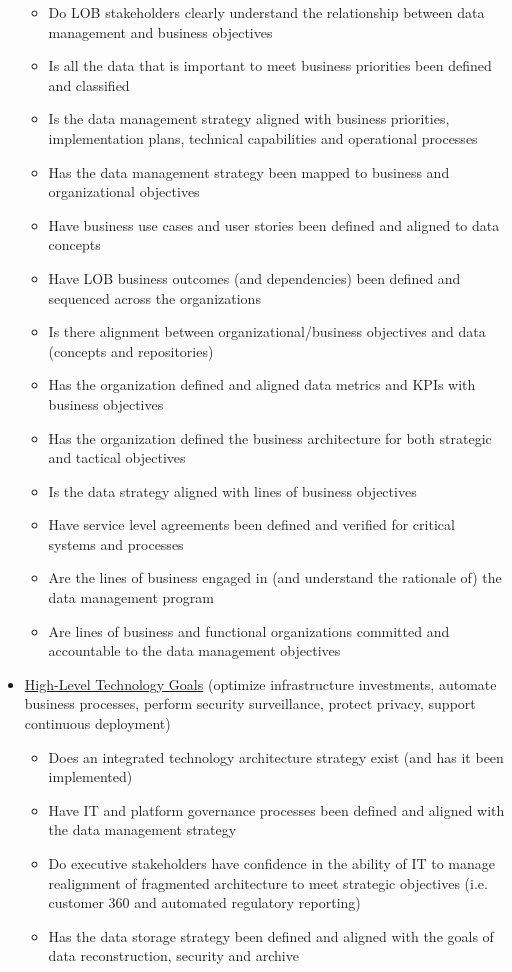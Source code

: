 \begin{itemize}
    \begin{itemize}
      \item Do LOB stakeholders clearly understand the relationship between data management and business objectives
      \item Is all the data that is important to meet business priorities been defined and classified
      \item Is the data management strategy aligned with business priorities, implementation plans, technical capabilities and operational processes
      \item Has the data management strategy been mapped to business and organizational objectives
      \item Have business use cases and user stories been defined and aligned to data concepts
      \item Have LOB business outcomes (and dependencies) been defined and sequenced across the organizations
      \item Is there alignment between organizational/business objectives and data (concepts and repositories)
      \item Has the organization defined and aligned data metrics and KPIs with business objectives
      \item Has the organization defined the business architecture for both strategic and tactical objectives
      \item Is the data strategy aligned with lines of business objectives
      \item Have service level agreements been defined and verified for critical systems and processes
      \item Are the lines of business engaged in (and understand the rationale of) the data management program
      \item Are lines of business and functional organizations committed and accountable to the data management objectives
    \end{itemize}

  \item \ul{High-Level Technology Goals} (optimize infrastructure investments, automate business processes, perform security surveillance, protect privacy, support continuous deployment)

    \begin{itemize}
      \item Does an integrated technology architecture strategy exist (and has it been implemented)
      \item Have IT and platform governance processes been defined and aligned with the data management strategy
      \item Do executive stakeholders have confidence in the ability of IT to manage realignment of fragmented architecture to meet strategic objectives (i.e. customer 360 and automated regulatory reporting)
      \item Has the data storage strategy been defined and aligned with the goals of data reconstruction, security and archive
    \end{itemize}


\end{itemize}
